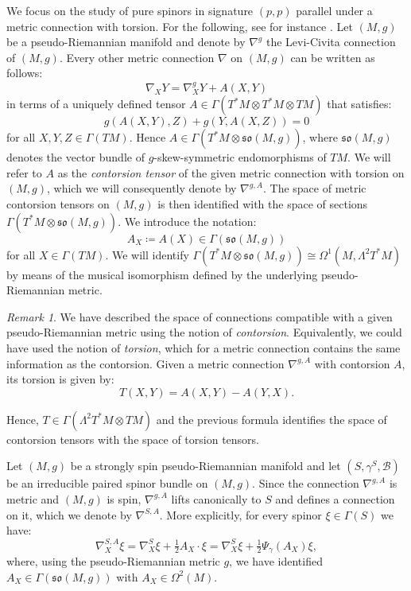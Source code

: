 \documentclass[10pt,reqno]{amsart}
\theoremstyle{definition}
\theoremstyle{remark}
\newtheorem{remark}[theorem]{Remark}
\begin{document}
We focus on the study of pure spinors in signature $(p,p)$ parallel under a metric connection with torsion. For the following, see for instance \cite{Agricola2006,ShahbaziThesis}. Let $(M,g)$ be a pseudo-Riemannian manifold and denote by $\nabla^g$ the Levi-Civita connection of $(M,g)$. Every other metric connection $\nabla$ on $(M,g)$ can be written as follows: $$\nabla_XY=\nabla^g_XY+A(X,Y)$$ in terms of a uniquely defined tensor $A\in\Gamma(T^*M\otimes T^*M\otimes TM)$ that satisfies: $$g(A(X,Y),Z)+g(Y,A(X,Z))=0$$ for all $X,Y,Z\in\Gamma(TM)$. Hence $A\in\Gamma(T^*M\otimes\mathfrak{so}(M,g))$, where $\mathfrak{so}(M,g)$ denotes the vector bundle of $g$-skew-symmetric endomorphisms of $TM$. We will refer to $A$ as the \emph{contorsion tensor} of the given metric connection with torsion on $(M,g)$, which we will consequently denote by $\nabla^{g,A}$. The space of metric contorsion tensors on $(M,g)$ is then identified with the space of sections $\Gamma(T^*M\otimes\mathfrak{so}(M,g))$. We introduce the notation: $$A_X\coloneqq A(X)\in\Gamma(\mathfrak{so}(M,g))$$ for all $X\in\Gamma(TM)$. We will identify $\Gamma(T^*M\otimes\mathfrak{so}(M,g))\cong\Omega^1(M,\Lambda^2T^*M)$ by means of the musical isomorphism defined by the underlying pseudo-Riemannian metric.

\begin{remark}
    We have described the space of connections compatible with a given pseudo-Riemannian metric using the notion of \emph{contorsion}. Equivalently, we could have used the notion of \emph{torsion}, which for a metric connection contains the same information as the contorsion. Given a metric connection $\nabla^{g,A}$ with contorsion $A$, its torsion is given by: $$T(X,Y)=A(X,Y)-A(Y,X).$$

    Hence, $T\in\Gamma(\Lambda^2T^*M\otimes TM)$ and the previous formula identifies the space of contorsion tensors with the space of torsion tensors.
\end{remark}

Let $(M,g)$ be a strongly spin pseudo-Riemannian manifold and let $(S,\gamma^S,\mathscr{B})$ be an irreducible paired spinor bundle on $(M,g)$. Since the connection $\nabla^{g,A}$ is metric and $(M,g)$ is spin, $\nabla^{g,A}$ lifts canonically to $S$ and defines a connection on it, which we denote by $\nabla^{S,A}$. More explicitly, for every spinor $\xi\in\Gamma(S)$ we have: $$\nabla^{S,A}_X\xi=\nabla^S_X\xi+\tfrac{1}{2}A_X\cdot\xi=\nabla^S_X\xi+\tfrac{1}{2}\Psi_\gamma(A_X)\xi,$$ where, using the pseudo-Riemannian metric $g$, we have identified $A_X\in\Gamma(\mathfrak{so}(M,g))$ with $A_X\in\Omega^2(M)$.
\end{document}
